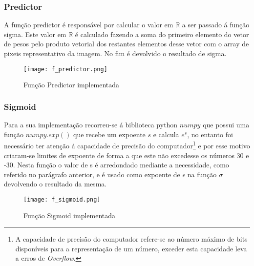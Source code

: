 \subsubsection{Predictor}\hfill\newline
	\hfill\newline

	A função predictor é responsável por calcular o valor em $\mathbb{R}$ a ser passado á função sigma. Este valor em $\mathbb{R}$ é calculado fazendo a soma do primeiro elemento do vetor de pesos pelo produto vetorial dos restantes elementos desse vetor com o array de pixeis representativo da imagem. No fim é devolvido o resultado de sigma.

	\begin{figure}[H]

	  \centering
	  \captionsetup{justification=centering}

	  \texttt{[image: f\_predictor.png]}
	  
	  \caption {Função Predictor implementada}
	\end{figure}


\subsubsection{Sigmoid}\hfill\newline
	\hfill\newline
	Para a sua implementação recorreu-se á biblioteca python $numpy$ que possui uma função $numpy.exp()$ que recebe um expoente $s$ e calcula $e^s$, no entanto foi necessário ter atenção á capacidade de precisão do computador\footnote{A capacidade de precisão do computador refere-se ao número máximo de bits disponíveis para a representação de um número, exceder esta capacidade leva a erros de \textit{Overflow}.} e por esse motivo criaram-se limites de expoente de forma a que este não excedesse os números 30 e -30. \newline
	Nesta função o valor de s é arredondado mediante a necessidade, como referido no parágrafo anterior, e é usado como expoente de $\epsilon$ na função $\sigma$ devolvendo o resultado da mesma.

	\begin{figure}[H]

	  \centering
	  \captionsetup{justification=centering}

	  \texttt{[image: f\_sigmoid.png]}
	  
	  \caption {Função Sigmoid implementada}
	\end{figure}


